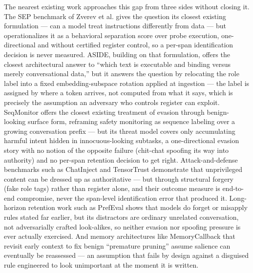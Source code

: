 \documentclass[11pt]{article}
\begin{document}
The nearest existing work approaches this gap from three sides without closing it. The SEP benchmark of Zverev et al. gives the question its closest existing formulation --- can a model treat instructions differently from data --- but operationalizes it as a behavioral separation score over probe execution, one-directional and without certified register control, so a per-span identification decision is never measured. ASIDE, building on that formulation, offers the closest architectural answer to ``which text is executable and binding versus merely conversational data,'' but it answers the question by relocating the role label into a fixed embedding-subspace rotation applied at ingestion --- the label is assigned by where a token arrives, not computed from what it says, which is precisely the assumption an adversary who controls register can exploit. SeqMonitor offers the closest existing treatment of evasion through benign-looking surface form, reframing safety monitoring as sequence labeling over a growing conversation prefix --- but its threat model covers only accumulating harmful intent hidden in innocuous-looking subtasks, a one-directional evasion story with no notion of the opposite failure (chit-chat spoofing its way into authority) and no per-span retention decision to get right. Attack-and-defense benchmarks such as ChatInject and TensorTrust demonstrate that unprivileged content can be dressed up as authoritative --- but through structural forgery (fake role tags) rather than register alone, and their outcome measure is end-to-end compromise, never the span-level identification error that produced it. Long-horizon retention work such as PrefEval shows that models do forget or misapply rules stated far earlier, but its distractors are ordinary unrelated conversation, not adversarially crafted look-alikes, so neither evasion nor spoofing pressure is ever actually exercised. And memory architectures like MemoryCallback that revisit early context to fix benign ``premature pruning'' assume salience can eventually be reassessed --- an assumption that fails by design against a disguised rule engineered to look unimportant at the moment it is written.
\end{document}
